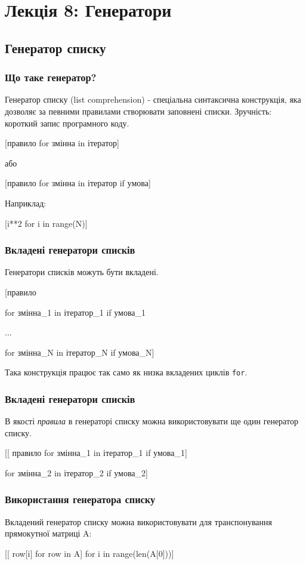 \section*{Лекція 8: Генератори}
 
 \subsection{Генератор списку} 
\begin{frame}
\frametitle{Що таке генератор?}
Генератор списку (list comprehension) - спеціальна синтаксична конструкція, яка дозволяє за певними правилами створювати заповнені списки. Зручність: короткий запис програмного коду.

\LARGE{[правило for змінна in ітератор]}

\normalsize або

\LARGE{[правило for змінна in ітератор if умова]}

\normalsize Наприклад:

[i**2 for i in range(N)]

\end{frame}

\begin{frame}
\frametitle{Вкладені генератори списків}
Генератори списків можуть бути вкладені.

\LARGE{[правило

 for змінна\_1 in ітератор\_1 if умова\_1
 
 ...
 
 for змінна\_N in ітератор\_N if умова\_N]}

\normalsize Така конструкція працює так само як низка вкладених циклів \texttt{for}.

\end{frame}

\begin{frame}
\frametitle{Вкладені генератори списків}
В якості \textit{правила} в генераторі списку можна використовувати ще один генератор списку.

\Large{[[ правило for змінна\_1 in ітератор\_1 if умова\_1]

 for змінна\_2 in ітератор\_2 if умова\_2]}

\end{frame}

\begin{frame}
\frametitle{Використання генератора списку}
Вкладений генератор списку можна використовувати для транспонування прямокутної матриці A:

\vspace{1cm}

\large{[[ row[i] for row in A] for i in range(len(A[0]))]}

\end{frame}


